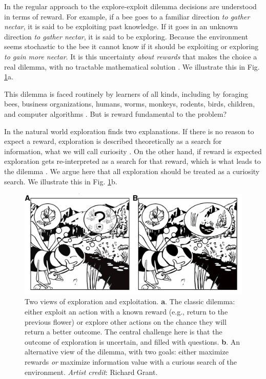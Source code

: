In the regular approach to the explore-exploit dilemma decisions are understood in terms of reward. For example, if a bee goes to a familiar direction \textit{to gather nectar}, it is said to be exploiting past knowledge. If it goes in an unknown direction \textit{to gather nectar}, it is said to be exploring. Because the environment seems stochastic to the bee it cannot know if it should be exploiting or exploring \textit{to gain more nectar}. It is this uncertainty \textit{about rewards} that makes the choice a real dilemma, with no tractable mathematical solution \citep{Thrun1992a,Dayan1996,Ishii2002,Simsek2006,Gershman2018b}. We illustrate this in Fig. \ref{fig:bee}a. 

This dilemma is faced routinely by learners of all kinds, including by foraging bees, business organizations, humans, worms, monkeys, rodents, birds, children, and computer algorithms \citep{Gupta2006,Sutton2018,Woodgate2017,Lee2011a,Schulz2018a,Calhoun2014,Wang2019,Sumner2019,Auersperg2015}. But is reward fundamental to the problem? 

In the natural world exploration finds two explanations. If there is no reason to expect a reward, exploration is described theoretically as a search for information, what we will call curiosity \citep{Berlyne1950,Schmidhuber1991,Kidd2015,deAbril2018,Jaegle2019,Friston2016}. On the other hand, if reward is expected exploration gets re-interpreted as a search for that reward, which is what leads to the dilemma \citep{Kelly1956,Berger-Tal2014,Dayan1996,Thrun1992,Mehlhorn2015,Kobayashi2019}. We argue here that all exploration should be treated as a curiosity search. We illustrate this in Fig. \ref{fig:bee}b.

\begin{figure}
	\begin{fullwidth}
	\includegraphics[width=.5\linewidth]{figures/fig1.png} 
	\caption{Two views of exploration and exploitation. \textbf{a}. The classic dilemma: either exploit an action with a known reward (e.g., return to the previous flower) or explore other actions on the chance they will return a better outcome. The central challenge here is that the outcome of exploration is uncertain, and filled with questions. \textbf{b}. An alternative view of the dilemma, with two goals: either maximize rewards \textit{or} maximize information value with a curious search of the environment. \textit{Artist credit}: Richard Grant.}
	\label{fig:bee} 
	\end{fullwidth}
\end{figure}

